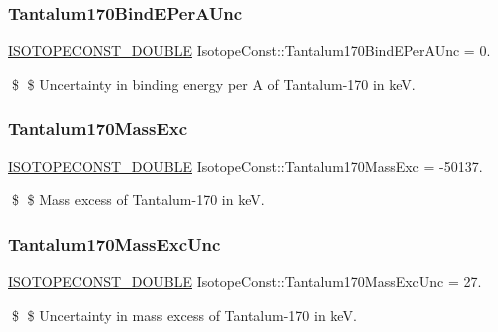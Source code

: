 \subsubsection{\texorpdfstring{Tantalum170\+Bind\+E\+Per\+A\+Unc}{Tantalum170BindEPerAUnc}}
{\footnotesize\ttfamily \mbox{\hyperlink{group___isotope_const-_macros_ga8f45a7272ce02c0b4c65c44636ed719a}{I\+S\+O\+T\+O\+P\+E\+C\+O\+N\+S\+T\+\_\+\+D\+O\+U\+B\+LE}} Isotope\+Const\+::\+Tantalum170\+Bind\+E\+Per\+A\+Unc = 0.}

\$ \$ Uncertainty in binding energy per A of Tantalum-\/170 in keV. \mbox{\label{group___isotope_const-_tantalum-_ta170_ga07733a8d96ca66a8db80974fb714fa26}} 
\subsubsection{\texorpdfstring{Tantalum170\+Mass\+Exc}{Tantalum170MassExc}}
{\footnotesize\ttfamily \mbox{\hyperlink{group___isotope_const-_macros_ga8f45a7272ce02c0b4c65c44636ed719a}{I\+S\+O\+T\+O\+P\+E\+C\+O\+N\+S\+T\+\_\+\+D\+O\+U\+B\+LE}} Isotope\+Const\+::\+Tantalum170\+Mass\+Exc = -\/50137.}

\$ \$ Mass excess of Tantalum-\/170 in keV. \mbox{\label{group___isotope_const-_tantalum-_ta170_ga9d662b004db44626fb22608b7b80a4c4}} 
\subsubsection{\texorpdfstring{Tantalum170\+Mass\+Exc\+Unc}{Tantalum170MassExcUnc}}
{\footnotesize\ttfamily \mbox{\hyperlink{group___isotope_const-_macros_ga8f45a7272ce02c0b4c65c44636ed719a}{I\+S\+O\+T\+O\+P\+E\+C\+O\+N\+S\+T\+\_\+\+D\+O\+U\+B\+LE}} Isotope\+Const\+::\+Tantalum170\+Mass\+Exc\+Unc = 27.}

\$ \$ Uncertainty in mass excess of Tantalum-\/170 in keV. \mbox{\label{group___isotope_const-_tantalum-_ta170_ga27f7bb55db7e94632e1e29fdf26e2996}} 
